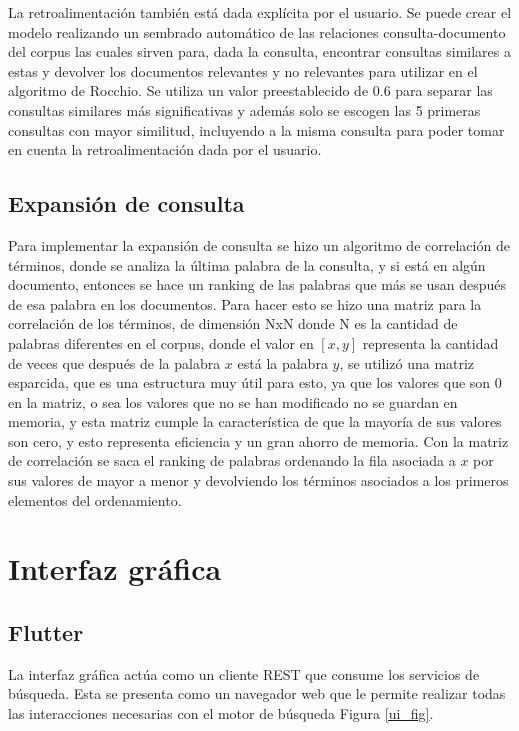 \documentclass[runningheads]{llncs}
\begin{document}
La retroalimentación también está dada explícita por el usuario. Se puede crear el modelo realizando 
un sembrado automático de las relaciones consulta-documento del corpus las cuales sirven para, dada la 
consulta, encontrar consultas similares a estas y devolver los documentos relevantes y no relevantes 
para utilizar en el algoritmo de Rocchio. Se utiliza un valor preestablecido de 0.6 para separar las 
consultas similares más significativas y además solo se escogen las 5 primeras consultas con mayor 
similitud, incluyendo a la misma consulta para poder tomar en cuenta la retroalimentación dada por el 
usuario.

\subsection{Expansión de consulta}

Para implementar la expansión de consulta se hizo un algoritmo de correlación de términos, donde se analiza la última palabra de la 
consulta, y si está en algún documento, entonces se hace un ranking de las palabras que más se usan después de esa palabra en los
documentos. Para hacer esto se hizo una matriz para la correlación de los términos, de dimensión NxN donde N es la cantidad de 
palabras diferentes en el corpus, donde el valor en $[x,y]$ representa la cantidad de veces que después de la palabra $x$ está 
la palabra $y$, se utilizó una matriz esparcida, que es una estructura muy útil para esto, ya que los valores que son 0 en la 
matriz, o sea los valores que no se han modificado no se guardan en memoria, y esta matriz cumple la característica de que la 
mayoría de sus valores son cero, y esto representa eficiencia y un gran ahorro de memoria. Con la matriz de correlación se saca 
el ranking de palabras ordenando la fila asociada a $x$ por sus valores de mayor a menor y devolviendo los términos asociados a 
los primeros elementos del ordenamiento.

\section{Interfaz gráfica}

\subsection{Flutter}

La interfaz gráfica actúa como un cliente REST que consume los servicios de búsqueda. Esta
se presenta como un navegador web que le permite realizar todas las interacciones necesarias
con el motor de búsqueda Figura \ref{ui_fig}.
\end{document}
